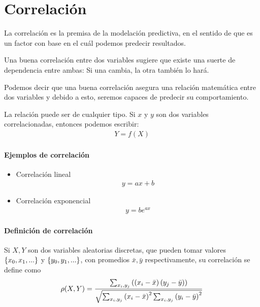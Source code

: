 \section{Correlación}

La correlación es la premisa de la modelación predictiva, en el sentido de que es un factor con base en el cuál podemos predecir resultados.


Una buena correlación entre dos variables sugiere que existe una suerte de dependencia entre ambas:  Si una cambia, la otra también lo hará. 

Podemos decir que una buena correlación asegura una relación matemática entre dos variables y debido a esto, seremos capaces de predecir su comportamiento.


La relación puede ser de cualquier tipo.  Si $x$ y $y$ son dos variables correlacionadas, entonces podemos escribir:
\begin{align}
	Y=f(X)
\end{align}

\paragraph{Ejemplos de correlación}
\begin{itemize}
	\item Correlación lineal
	\begin{align}
		y = ax+b
	\end{align}
	\item Correlación exponencial
	\begin{align}
		y = be^{ax}
	\end{align}
\end{itemize}


\paragraph{Definición de correlación} Si $X,Y$ son dos variables aleatorias discretas, que pueden tomar valores $\left\{ x_{0},x_{1},... \right\}$ y $\left\{ y_{0},y_{1},... \right\}$, con promedios $\bar{x}, \bar{y}$  respectivamente, su correlación se define como
\begin{align}
	\rho(X,Y) = \dfrac{\sum_{x_{i},y_{j}}
		\left( \left( x_{i}-\bar{x} \right)\left( y_{j}-\bar{y} \right) \right)}
	{\sqrt{\sum_{x_{i},y_{j}}
			\left( x_{i}-\bar{x} \right)^{2}\sum_{x_{i},y_{j}}
			\left( y_{i}-\bar{y} \right)^{2}}}
\end{align}



